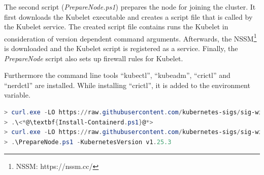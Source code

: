 The second script (\textit{PrepareNode.ps1}) prepares the node for joining the cluster. It first downloads the Kubelet executable and creates a script file that is called by the Kubelet service. The created script file contains runs the Kubelet in consideration of version dependent command arguments. Afterwards, the \ac{NSSM}\footnote{NSSM: https://nssm.cc/} is downloaded and the Kubelet script is registered as a service. Finally, the \textit{PrepareNode} script also sets up firewall rules for Kubelet.

Furthermore the command line tools \enquote{kubectl}, \enquote{kubeadm}, \enquote{crictl} and \enquote{nerdctl} are installed. While installing \enquote{crictl}, it is added to the  environment variable.

\begin{lstlisting}[label=lst:worker.sig_scripts, caption={PowerShell commands for retrieval of node preparation scripts\cite{GitHubKubernetesSIGWindowsTools.20230213}}, language=PowerShell, morekeywords={curl.exe, Install-Containerd.ps1, PrepareNode.ps1}]
> curl.exe -LO https://raw.githubusercontent.com/kubernetes-sigs/sig-windows-tools/master/kubeadm/scripts/Install-Containerd.ps1
> .\<*@\textbf{Install-Containerd.ps1}@*>
> curl.exe -LO https://raw.githubusercontent.com/kubernetes-sigs/sig-windows-tools/master/kubeadm/scripts/Prepare<*@\kern.7pt@*>Node.ps1
> .\PrepareNode.ps1 -KubernetesVersion v1.25.3
\end{lstlisting}

%
%



